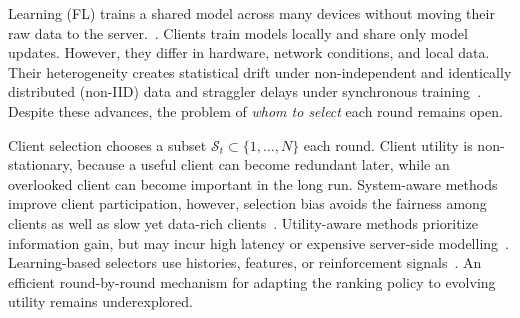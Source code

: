 \documentclass[journal]{IEEEtran}
\theoremstyle{remark}
\newcommand{\revision}[1]{#1}
\begin{document}
 Learning (FL) trains a shared model across many devices without moving their raw data to the server.~\cite{mcmahan2017communication}. \revision{Clients train models locally and share only model updates. However, they differ in hardware, network conditions, and local data. Their heterogeneity creates statistical drift under non-independent and identically distributed (non-IID) data and straggler delays under synchronous training}~\cite{karimireddy2020scaffold,mai2024study,tapwal2026stragglers,forootani2026asynchronous,borazjani2026redefining}. Despite these advances, the problem of \textit{whom to select} each round remains open.

Client selection chooses a subset $\revision{\mathcal{S}_t} \subset \{1, \ldots, N\}$ each round. \revision{Client utility is non-stationary, because a useful client can become redundant later, while an overlooked client can become important in the long run.} System-aware methods improve client participation, however, selection bias avoids the fairness among clients as well as slow yet data-rich clients~\cite{nishio2019client,chai2020tifl}. Utility-aware methods prioritize information gain, but may incur high latency or expensive server-side modelling~\cite{lai2021oort,tang2022fedcor,xu2024federated,yan2023criticalfl,ning2024fedgcs}. Learning-based selectors use histories, features, or reinforcement signals~\cite{wang2020optimizing,pan2024contextual,kazemi2026robust}. \revision{An efficient round-by-round mechanism for adapting the ranking policy to evolving utility remains underexplored.}
\end{document}

